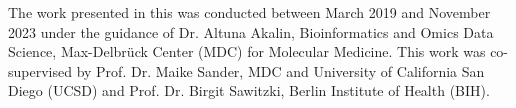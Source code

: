 
\begin{supervisorpage}




\vspace{100pt} %
\noindent

The work presented in this was conducted between March 2019 and November 2023 under the guidance of Dr. Altuna Akalin, Bioinformatics and Omics Data Science, Max-Delbrück Center (MDC) for Molecular Medicine. This work was co-supervised by Prof. Dr. Maike Sander, MDC and University of California San Diego (UCSD) and Prof. Dr. Birgit Sawitzki, Berlin Institute of Health (BIH).\\

\vspace{10pt} %


\end{supervisorpage}
